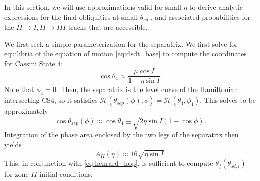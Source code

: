\documentclass[
        fleqn,
        usenatbib,
        referee,
    ]{mnras}
\newcommand*{\p}[1]{\left(#1\right)}
\begin{document}
In this section, we will use approximations valid for small $\eta$ to derive
analytic expressions for the final obliquities at small $\theta_{sd, i}$ and
associated probabilities for the $II \to I, II \to III$ tracks that are
accessible.

We first seek a simple parameterization for the separatrix. We first solve for
equilibria of the equation of motion \autoref{eq:dsdt_base} to compute the
coordinates for Cassini State 4:
\begin{equation}
    \cos \theta_4 \approx \frac{\mu \cos I}{1 - \eta \sin I}.
\end{equation}
Note that $\phi_4 = 0$. Then, the separatrix is the level curve of the
Hamiltonian intersecting CS4, so it satisfies $\mathcal{H}\p{\theta_{sep}(\phi),
\phi} = \mathcal{H}\p{\theta_4, \phi_4}$. This solves to be approximately
\begin{equation}
    \cos \theta_{sep}(\phi) \approx \cos \theta_4 \pm
        \sqrt{2\eta \sin I\p{1 - \cos \phi}}.
\end{equation}
Integration of the phase area enclosed by the two legs of the separatrix then
yields
\begin{equation}
    A_{II}(\eta) \approx 16\sqrt{\eta \sin I}.\label{eq:a_approx}
\end{equation}
This, in conjunction with \autoref{eq:henrard_hop}, is sufficient to compute
$\theta_f\p{\theta_{sd, i}}$ for zone $II$ initial conditions.
\end{document}
